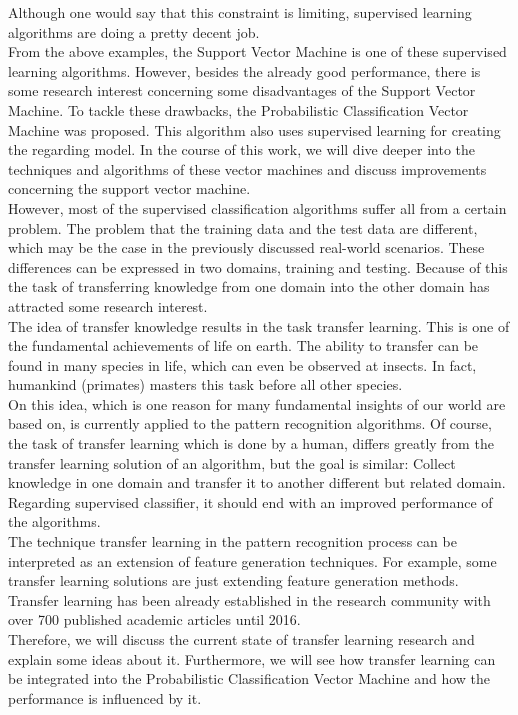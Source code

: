 Although one would say that this constraint is limiting, supervised learning algorithms are doing a pretty decent job.\\
From the above examples, the Support Vector Machine is one of these supervised learning algorithms. 
However, besides the already good performance, there is some research interest concerning some disadvantages of the Support Vector Machine.
To tackle these drawbacks, the Probabilistic Classification Vector Machine was proposed.
This algorithm also uses supervised learning for creating the regarding model.
In the course of this work, we will dive deeper into the techniques and algorithms of these vector machines and discuss improvements concerning the support vector machine.\\
However, most of the supervised classification algorithms suffer all from a certain problem. 
The problem that the training data and the test data are different, which may be the case in the previously discussed real-world scenarios.
These differences can be expressed in two domains, training and testing.
Because of this the task of transferring knowledge from one domain into the other domain has attracted some research interest.\\
The idea of transfer knowledge results in the task transfer learning. 
This is one of the fundamental achievements of life on earth.
The ability to transfer can be found in many species in life, which can even be observed at insects.
In fact, humankind (primates) masters this task before all other species.\\
On this idea, which is one reason for many fundamental insights of our world are based on, is currently applied to the pattern recognition algorithms. 
Of course, the task of transfer learning which is done by a human, differs greatly from the transfer learning solution of an algorithm, but the goal is similar:
Collect knowledge in one domain and transfer it to another different but related domain. Regarding supervised classifier, it should end with an improved performance of the algorithms.\\
The technique transfer learning in the pattern recognition process can be interpreted as an extension of feature generation techniques.
For example, some transfer learning solutions are just extending feature generation methods. 
Transfer learning has been already established in the research community with over 700 published academic articles until 2016.\\
Therefore, we will discuss the current state of transfer learning research and explain some ideas about it.
Furthermore, we will see how transfer learning can be integrated into the Probabilistic Classification Vector Machine and how the performance is influenced by it.\\
\cite{Paluszek.2017}\cite{Wu.2008}\cite{Singh.2010}\cite{TrevorHastie.2009}\cite{Theodoridis.2015}\cite{Buchholtz.1982} \cite{Theodoridis.2008} \cite{Weiss.2016}\cite{Bishop.2009}\cite{Tipping.2001}\cite{Chen.2009}\cite{Pan.2010}\cite{Weiss.2016}\cite{Theodoridis.2008}